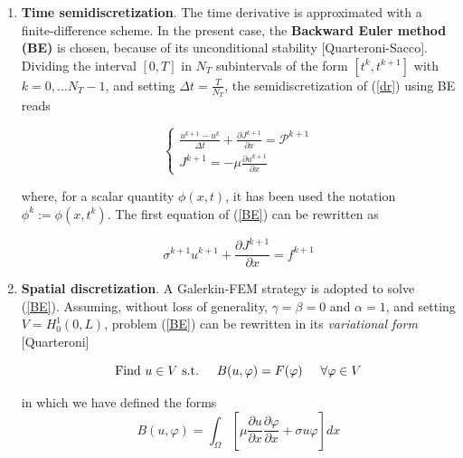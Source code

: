 \documentclass[12pt, a4paper]{article}
\begin{document}
\begin{enumerate}
	\item \textbf{Time semidiscretization}. The time derivative is approximated with a finite-difference scheme. In the present case, the \textbf{Backward Euler method (BE)} is chosen, because of its unconditional stability [Quarteroni-Sacco]. Dividing the interval $[0,T]$ in $N_T$ subintervals of the form $[t^k, t^{k+1}]$ with $ k=0, \dots N_T-1$, and setting $\Delta t = \frac{T}{N_T} $, the semidiscretization of (\ref{dr}) using BE reads
	
	\begin{equation}
	\begin{cases}
	\frac{u^{k+1} - u^k}{\Delta t} +\frac{\partial J^{k+1}}{\partial x} = \mathcal{P}^{k+1}  \\
	J^{k+1} =  - \mu \frac{\partial u^{k+1}}{\partial x} 
	\end{cases} \label{BE}
	\end{equation}
	
	where, for a scalar quantity $\phi(x,t)$, it has been used the notation $ \phi^k := \phi(x,t^k) $. The first equation of (\ref{BE}) can be rewritten as
	
	\begin{equation}
	\sigma ^{k+1} u^{k+1} +\frac{\partial J^{k+1}}{\partial x} = f^{k+1} 
	\end{equation}
	
	\item \textbf{Spatial discretization}. A Galerkin-FEM strategy is adopted to solve (\ref{BE}).  Assuming, without loss of generality, $\gamma = \beta = 0$ and $\alpha =1$, and setting $V = H_0^1(0,L)$,  problem (\ref{BE}) can be rewritten in its \textit{variational form} [Quarteroni]
	
	\begin{equation}
	\text{Find $u \in V$ s.t.} \hspace{0.5cm} B(u,\varphi) = F(\varphi) \hspace{0.5cm} \forall \varphi \in V
	\label{variational}
	\end{equation}
	
	in which we have defined the forms
	\begin{equation}
	B(u,\varphi) = \int_{\Omega}\left[\mu \frac{\partial u}{\partial x}  \frac{\partial \varphi}{\partial x} + \sigma u \varphi \right]  dx
	\end{equation}
	

\end{enumerate}
\end{document}
